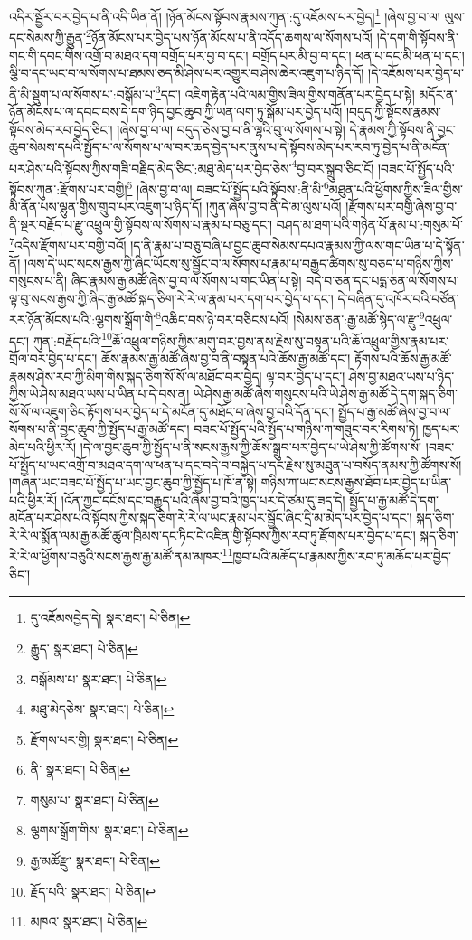 འདིར་སྦྱོར་བར་བྱེད་པ་ནི་འདི་ཡིན་ནོ། །ཉོན་མོངས་སྟོབས་རྣམས་ཀུན་:དུ་འཇོམས་པར་བྱེད།\footnote{དུ་འཇོམསབྱེད་དེ།  སྣར་ཐང་།  པེ་ཅིན། } །ཞེས་བྱ་བ་ལ། ལུས་དང་སེམས་ཀྱི་རྒྱུན་\footnote{རྒྱུད་  སྣར་ཐང་།  པེ་ཅིན། }ཉོན་མོངས་པར་བྱེད་པས་ཉོན་མོངས་པ་ནི་འདོད་ཆགས་ལ་སོགས་པའོ། །དེ་དག་གི་སྟོབས་ནི་གང་གི་དབང་གིས་འགྲོ་བ་མཐའ་དག་བགྲོད་པར་བྱ་བ་དང་། བགྲོད་པར་མི་བྱ་བ་དང་། ཕན་པ་དང་མི་ཕན་པ་དང་། ལྕི་བ་དང་ཡང་བ་ལ་སོགས་པ་ཐམས་ཅད་མི་ཤེས་པར་འགྱུར་བ་ཤེས་ཆེར་འཇུག་པ་ཉིད་དོ། །དེ་འཇོམས་པར་བྱེད་པ་ནི་མི་སྡུག་པ་ལ་སོགས་པ་:བསྒོམ་པ་\footnote{བསྒོམས་པ་  སྣར་ཐང་།  པེ་ཅིན། }དང་། འཇིག་རྟེན་པའི་ལམ་གྱིས་ཟིལ་གྱིས་གནོན་པར་བྱེད་པ་སྟེ། མདོར་ན་ཉོན་མོངས་པ་ལ་དབང་བས་དེ་དག་ཉིད་བྱང་ཆུབ་ཀྱི་ཡན་ལག་ཏུ་སྒོམ་པར་བྱེད་པའོ། །བདུད་ཀྱི་སྟོབས་རྣམས་སྟོབས་མེད་རབ་བྱེད་ཅིང་། །ཞེས་བྱ་བ་ལ། བདུད་ཅེས་བྱ་བ་ནི་ལྷའི་བུ་ལ་སོགས་པ་སྟེ། དེ་རྣམས་ཀྱི་སྟོབས་ནི་བྱང་ཆུབ་སེམས་དཔའི་སྤྱོད་པ་ལ་སོགས་པ་ལ་བར་ཆད་བྱེད་པར་ནུས་པ་དེ་སྟོབས་མེད་པར་རབ་ཏུ་བྱེད་པ་ནི་མངོན་པར་ཤེས་པའི་སྟོབས་ཀྱིས་གཟི་བརྗིད་མེད་ཅིང་:མཐུ་མེད་པར་བྱེད་ཅེས་\footnote{མཐུ་མེདཅེས་  སྣར་ཐང་།  པེ་ཅིན། }བྱ་བར་སྒྲུབ་ཅིང་ངོ། །བཟང་པོ་སྤྱོད་པའི་སྟོབས་ཀུན་:རྫོགས་པར་བགྱི།\footnote{རྫོགས་པར་གྱི།  སྣར་ཐང་།  པེ་ཅིན། } །ཞེས་བྱ་བ་ལ། བཟང་པོ་སྤྱོད་པའི་སྟོབས་:ནི་མི་\footnote{ནི་  སྣར་ཐང་།  པེ་ཅིན། }མཐུན་པའི་ཕྱོགས་ཀྱིས་ཟིལ་གྱིས་མི་ནོན་པས་ལྷུན་གྱིས་གྲུབ་པར་འཇུག་པ་ཉིད་དོ། །ཀུན་ཞེས་བྱ་བ་ནི་དེ་མ་ལུས་པའོ། །རྫོགས་པར་བགྱི་ཞེས་བྱ་བ་ནི་སྔར་བརྗོད་པ་རྫུ་འཕྲུལ་གྱི་སྟོབས་ལ་སོགས་པ་རྣམ་པ་བཅུ་དང་། བཤད་མ་ཐག་པའི་གཉེན་པོ་རྣམ་པ་:གསུམ་པོ་\footnote{གསུམ་པ་  སྣར་ཐང་།  པེ་ཅིན། }འདིས་རྫོགས་པར་བགྱི་བའོ། །ད་ནི་རྣམ་པ་བཅུ་བཞི་པ་བྱང་ཆུབ་སེམས་དཔའ་རྣམས་ཀྱི་ལས་གང་ཡིན་པ་དེ་སྟོན་ནོ། །ལས་དེ་ཡང་སངས་རྒྱས་ཀྱི་ཞིང་ཡོངས་སུ་སྦྱོང་བ་ལ་སོགས་པ་རྣམ་པ་བརྒྱད་ཚིགས་སུ་བཅད་པ་གཉིས་ཀྱིས་གསུངས་པ་ནི། ཞིང་རྣམས་རྒྱ་མཚོ་ཞེས་བྱ་བ་ལ་སོགས་པ་གང་ཡིན་པ་སྟེ། བདེ་བ་ཅན་དང་པདྨ་ཅན་ལ་སོགས་པ་ལྟ་བུ་སངས་རྒྱས་ཀྱི་ཞིང་རྒྱ་མཚོ་སྐད་ཅིག་རེ་རེ་ལ་རྣམ་པར་དག་པར་བྱེད་པ་དང་། དེ་བཞིན་དུ་འཁོར་བའི་བཙོན་རར་ཉོན་མོངས་པའི་:ལྕགས་སྒྲོག་གི་\footnote{ལྕགས་སྒྲོག་གིས་  སྣར་ཐང་།  པེ་ཅིན། }འཆིང་བས་ཉེ་བར་བཅིངས་པའོ། །སེམས་ཅན་:རྒྱ་མཚོ་སྙེད་ལ་རྫུ་\footnote{རྒྱ་མཚོརྫུ་  སྣར་ཐང་།  པེ་ཅིན། }འཕྲུལ་དང་། ཀུན་:བརྗོད་པའི་\footnote{རྗོད་པའི་  སྣར་ཐང་།  པེ་ཅིན། }ཆོ་འཕྲུལ་གཉིས་ཀྱིས་མགུ་བར་བྱས་ནས་རྗེས་སུ་བསྟན་པའི་ཆོ་འཕྲུལ་གྱིས་རྣམ་པར་གྲོལ་བར་བྱེད་པ་དང་། ཆོས་རྣམས་རྒྱ་མཚོ་ཞེས་བྱ་བ་ནི་བསྟན་པའི་ཆོས་རྒྱ་མཚོ་དང་། རྟོགས་པའི་ཆོས་རྒྱ་མཚོ་རྣམས་ཤེས་རབ་ཀྱི་མིག་གིས་སྐད་ཅིག་སོ་སོ་ལ་མཐོང་བར་བྱེད། ལྟ་བར་བྱེད་པ་དང་། ཤེས་བྱ་མཐའ་ཡས་པ་ཉིད་ཀྱིས་ཡེ་ཤེས་མཐའ་ཡས་པ་ཡིན་པ་དེ་བས་ན། ཡེ་ཤེས་རྒྱ་མཚོ་ཞེས་གསུངས་པའི་ཡེ་ཤེས་རྒྱ་མཚོ་དེ་དག་སྐད་ཅིག་སོ་སོ་ལ་འཇུག་ཅིང་རྟོགས་པར་བྱེད་པ་དེ་མངོན་དུ་མཐོང་བ་ཞེས་བྱ་བའི་དོན་དང་། སྤྱོད་པ་རྒྱ་མཚོ་ཞེས་བྱ་བ་ལ་སོགས་པ་ནི་བྱང་ཆུབ་ཀྱི་སྤྱོད་པ་རྒྱ་མཚོ་དང་། བཟང་པོ་སྤྱོད་པའི་སྤྱོད་པ་གཉིས་ཀ་གཟུང་བར་རིགས་ཏེ། ཁྱད་པར་མེད་པའི་ཕྱིར་རོ། །དེ་ལ་བྱང་ཆུབ་ཀྱི་སྤྱོད་པ་ནི་སངས་རྒྱས་ཀྱི་ཆོས་སྒྲུབ་པར་བྱེད་པ་ཡེ་ཤེས་ཀྱི་ཚོགས་སོ། །བཟང་པོ་སྤྱོད་པ་ཡང་འགྲོ་བ་མཐའ་དག་ལ་ཕན་པ་དང་བདེ་བ་བསྐྱེད་པ་དང་རྗེས་སུ་མཐུན་པ་བསོད་ནམས་ཀྱི་ཚོགས་སོ། །གཞན་ཡང་བཟང་པོ་སྤྱོད་པ་ཡང་བྱང་ཆུབ་ཀྱི་སྤྱོད་པ་ཁོ་ན་སྟེ། གཉིས་ཀ་ཡང་སངས་རྒྱས་ཐོབ་པར་བྱེད་པ་ཡིན་པའི་ཕྱིར་རོ། །འོན་ཀྱང་དངོས་དང་བརྒྱུད་པའི་ཞེས་བྱ་བའི་ཁྱད་པར་དེ་ཙམ་དུ་ཟད་དེ། སྤྱོད་པ་རྒྱ་མཚོ་དེ་དག་མངོན་པར་ཤེས་པའི་སྟོབས་ཀྱིས་སྐད་ཅིག་རེ་རེ་ལ་ཡང་རྣམ་པར་སྦྱོང་ཞིང་དྲི་མ་མེད་པར་བྱེད་པ་དང་། སྐད་ཅིག་རེ་རེ་ལ་སྨོན་ལམ་རྒྱ་མཚོ་ཚུལ་ཁྲིམས་དང་ཏིང་ངེ་འཛིན་གྱི་སྟོབས་ཀྱིས་རབ་ཏུ་རྫོགས་པར་བྱེད་པ་དང་། སྐད་ཅིག་རེ་རེ་ལ་ཕྱོགས་བཅུའི་སངས་རྒྱས་རྒྱ་མཚོ་ནམ་མཁར་\footnote{མཁའ་  སྣར་ཐང་།  པེ་ཅིན། }ཁྱབ་པའི་མཆོད་པ་རྣམས་ཀྱིས་རབ་ཏུ་མཆོད་པར་བྱེད་ཅིང་། 
